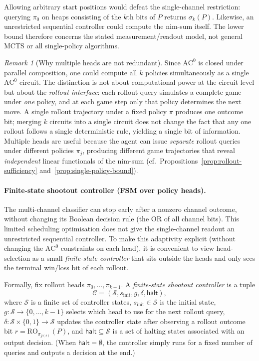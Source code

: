 \documentclass[11pt]{article}
\newcommand{\AC}{\mathrm{AC}}
\theoremstyle{plain}
\theoremstyle{definition}
\theoremstyle{remark}
\newtheorem{remark}[theorem]{Remark}
\numberwithin{equation}{section}
\begin{document}
Allowing arbitrary start positions would defeat the single-channel restriction: querying $\pi_0$ on heaps consisting of the $k$th bits of $P$ returns $\sigma_k(P)$. Likewise, an unrestricted sequential controller could compute the nim-sum itself. The lower bound therefore concerns the stated measurement/readout model, not general MCTS or all single-policy algorithms.



\begin{remark}[Why multiple heads are not redundant]
\label{rem:why-multi-head}
Since $\AC^0$ is closed under parallel composition, one could compute all $k$ policies simultaneously as a single $\AC^0$ circuit.
The distinction is not about computational power at the circuit level but about the \emph{rollout interface}: each rollout query simulates a complete game under \emph{one} policy, and at each game step only that policy determines the next move.
A single rollout trajectory under a fixed policy $\pi$ produces one outcome bit; merging $k$ circuits into a single circuit does not change the fact that any one rollout follows a single deterministic rule, yielding a single bit of information.
Multiple heads are useful because the agent can issue \emph{separate} rollout queries under different policies $\pi_j$, producing different game trajectories that reveal \emph{independent} linear functionals of the nim-sum (cf.\ Propositions~\ref{prop:rollout-sufficiency} and~\ref{prop:single-policy-bound}).
\end{remark}

\paragraph{Finite-state shootout controller (FSM over policy heads).}
\label{par:shootout-controller}
The multi-channel classifier can stop early after a nonzero channel outcome, without changing its Boolean decision rule (the OR of all channel bits). This limited scheduling optimisation does not give the single-channel readout an unrestricted sequential controller.
To make this adaptivity explicit (without changing the $\AC^0$ constraints on each head), it is convenient to view head-selection as a small \emph{finite-state controller} that sits outside the heads and only sees the terminal win/loss bit of each rollout.

Formally, fix rollout heads $\pi_0,\dots,\pi_{k-1}$.
A \emph{finite-state shootout controller} is a tuple
\[
\mathcal{C} = (\mathcal{S}, s_{\mathrm{init}}, g, \delta, \mathsf{halt}),
\]
where $\mathcal{S}$ is a finite set of controller states, $s_{\mathrm{init}}\in\mathcal{S}$ is the initial state,
$g\colon \mathcal{S}\to\{0,\dots,k-1\}$ selects which head to use for the next rollout query,
$\delta\colon \mathcal{S}\times\{0,1\}\to\mathcal{S}$ updates the controller state after observing a rollout outcome bit
$r=\mathrm{RO}_{\pi_{g(s)}}(P)$, and $\mathsf{halt}\subseteq \mathcal{S}$ is a set of halting states associated with an output decision.
(When $\mathsf{halt}=\emptyset$, the controller simply runs for a fixed number of queries and outputs a decision at the end.)
\end{document}
